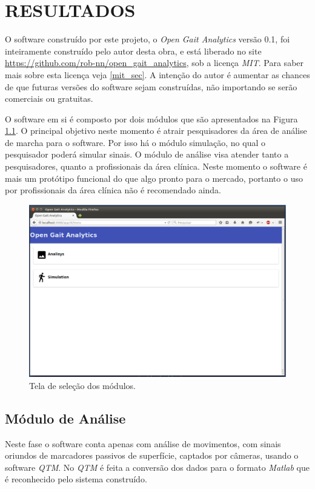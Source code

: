 \chapter[RESULTADOS]{\textbf {RESULTADOS}}

O software construído por este projeto, o \emph{Open Gait Analytics} versão 0.1, foi inteiramente construído pelo autor desta obra, e está liberado no site \url{https://github.com/rob-nn/open_gait_analytics}, sob a licença \emph{MIT}. Para saber mais sobre esta licença veja \ref{mit_sec}.
A intenção do autor é aumentar as chances de que futuras versões do software sejam construídas, não importando se serão comerciais ou gratuitas.

O software em si é composto por dois módulos que são apresentados na Figura \ref{tela1}. O principal objetivo neste momento é atrair pesquisadores da área de análise de marcha para o software. Por isso há o módulo simulação, no qual o pesquisador poderá simular sinais.
O módulo de análise visa atender tanto a pesquisadores, quanto a profissionais da área clínica. Neste momento o software é mais um protótipo funcional do que algo pronto para o mercado, portanto o uso por profissionais da área clínica não é recomendado ainda.

\begin{figure}[ht]
	\centering
	\includegraphics[width=15cm]{figuras/tela1.eps}
	\caption{Tela de seleção dos módulos.}
	\label{tela1}
\end{figure}

\section{Módulo de Análise}
Neste fase o software conta apenas com análise de movimentos, com sinais oriundos de marcadores passivos de superfície, captados por câmeras, usando o software \emph{QTM}. 
No \emph{QTM} é feita a conversão dos dados para o formato \emph{Matlab} que é reconhecido pelo sistema construído.

